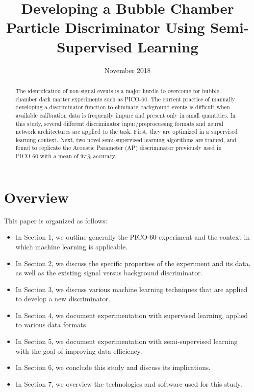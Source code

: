 \documentclass[10pt]{article}
\begin{document}
\title{Developing a Bubble Chamber Particle Discriminator Using Semi-Supervised Learning}

\date{November 2018}
\maketitle

\begin{abstract}
    The identification of non-signal events is a major hurdle to overcome for bubble chamber dark matter experiments such as PICO-60. The current practice of manually developing a discriminator function to eliminate background events is difficult when available calibration data is frequently impure and present only in small quantities. In this study, several different discriminator input/preprocessing formats and neural network architectures are applied to the task. First, they are optimized in a supervised learning context. Next, two novel semi-supervised learning algorithms are trained, and found to replicate the Acoustic Parameter (AP) discriminator previously used in PICO-60 with a mean of 97\% accuracy.
\end{abstract}

\pagebreak

\section*{Overview}

This paper is organized as follows:
\begin{itemize}
    \item In Section 1, we outline generally the PICO-60 experiment and the context in which machine learning is applicable.
    \item In Section 2, we discuss the specific properties of the experiment and its data, as well as the existing signal versus background discriminator.
    \item In Section 3, we discuss various machine learning techniques that are applied to develop a new discriminator.
    \item In Section 4, we document experimentation with supervised learning, applied to various data formats.
    \item In Section 5, we document experimentation with semi-supervised learning with the goal of improving data efficiency.
    \item In Section 6, we conclude this study and discuss its implications.
    \item In Section 7, we overview the technologies and software used for this study.
\end{itemize}
\end{document}
